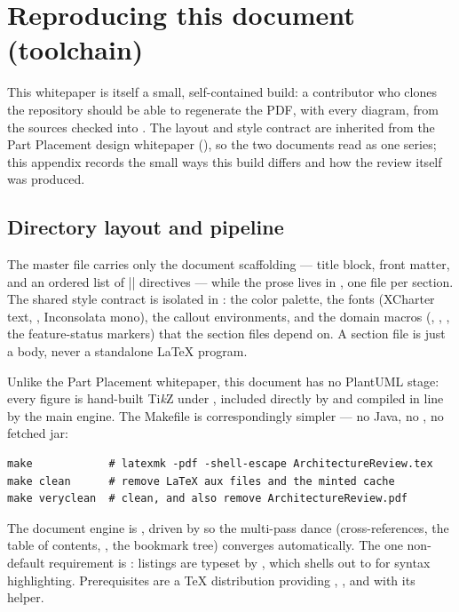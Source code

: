 \section{Reproducing this document (toolchain)}\label{sec:repro}

This whitepaper is itself a small, self-contained build: a contributor who clones the
repository should be able to regenerate the PDF, with every diagram, from the sources
checked into . The layout and style contract are
inherited from the Part Placement design whitepaper
(), so the two documents read as one series; this
appendix records the small ways this build differs and how the review itself was produced.

\subsection{Directory layout and pipeline}

The master file  carries only the document scaffolding ---
title block, front matter, and an ordered list of \cppinline|| directives --- while
the prose lives in , one file per section. The shared style contract is
isolated in : the color palette, the fonts (XCharter text,
, Inconsolata mono), the callout environments, and the domain macros
(, , , the
feature-status markers) that the section files depend on. A section file is just a body,
never a standalone \LaTeX{} program.

Unlike the Part Placement whitepaper, this document has no PlantUML stage: every figure is
hand-built Ti\emph{k}Z under , included directly by
 and compiled in line by the main engine. The Makefile is
correspondingly simpler --- no Java, no , no fetched jar:

\begin{verbatim}
make            # latexmk -pdf -shell-escape ArchitectureReview.tex
make clean      # remove LaTeX aux files and the minted cache
make veryclean  # clean, and also remove ArchitectureReview.pdf
\end{verbatim}

The document engine is , driven by  so the multi-pass dance
(cross-references, the table of contents, , the bookmark tree) converges
automatically. The one non-default requirement is : listings are
typeset by , which shells out to  for syntax highlighting.
Prerequisites are a \TeX{} distribution providing , , and
 with its  helper.

